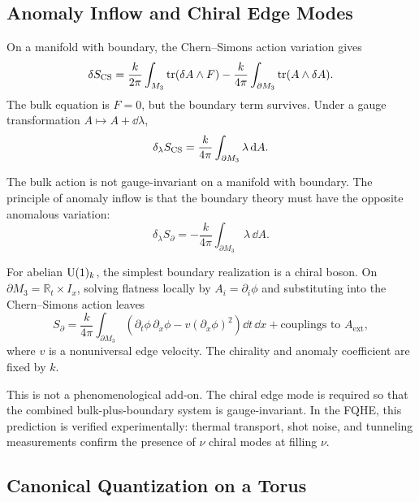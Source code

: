 \subsection{Anomaly Inflow and Chiral Edge Modes}
\label{subsec:fqhe-anomaly-inflow}

On a manifold with boundary, the Chern--Simons action variation gives
\begin{equation}
  \delta S_{\operatorname{CS}}
  =
  \frac{k}{2\pi}\int_{M_3}\operatorname{tr}(\delta A\wedge F)
  -
  \frac{k}{4\pi}\int_{\partial M_3}\operatorname{tr}(A\wedge\delta A).
  \label{eq:fqhe-boundary-variation}
\end{equation}
The bulk equation is $F=0$, but the boundary term survives. Under a gauge transformation $A\mapsto A+\dd\lambda$,
\begin{equation}
  \delta_\lambda S_{\operatorname{CS}}
  =
  \frac{k}{4\pi}\int_{\partial M_3}\lambda\,\mathrm{d} A.
  \label{eq:fqhe-boundary-gauge-anomaly}
\end{equation}

The bulk action is not gauge-invariant on a manifold with boundary. The principle of anomaly inflow is that the boundary theory must have the opposite anomalous variation:
\begin{equation}
  \delta_\lambda S_{\partial}
  =
  -
  \frac{k}{4\pi}\int_{\partial M_3}\lambda\,\dd A.
  \label{eq:fqhe-boundary-cancel}
\end{equation}

For abelian $\operatorname{U}(1)_k$, the simplest boundary realization is a chiral boson. On $\partial M_3=\mathbb R_t\times I_x$, solving flatness locally by $A_i=\partial_i\phi$ and substituting into the Chern--Simons action leaves
\begin{equation}
  S_{\partial}
  =
  \frac{k}{4\pi}\int_{\partial M_3}
  \left(\partial_t\phi\,\partial_x\phi
  -
  v(\partial_x\phi)^2\right)\dd t\,\dd x
  +
  \text{couplings to }A_{\mathrm{ext}},
  \label{eq:fqhe-chiral-boson}
\end{equation}
where $v$ is a nonuniversal edge velocity. The chirality and anomaly coefficient are fixed by $k$.

This is not a phenomenological add-on. The chiral edge mode is required so that the combined bulk-plus-boundary system is gauge-invariant. In the FQHE, this prediction is verified experimentally: thermal transport, shot noise, and tunneling measurements confirm the presence of $\nu$ chiral modes at filling $\nu$.

\subsection{Canonical Quantization on a Torus}
\label{subsec:fqhe-torus-quantization}

